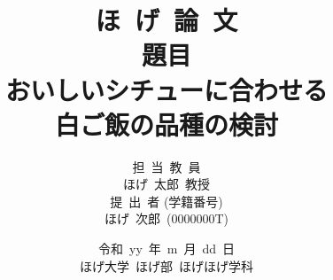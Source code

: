 \title{{\Huge ほ~げ~論~文} \\
\vspace{2cm} 題\hspace{1cm}目 \\
\vspace{0.3cm}おいしいシチューに合わせる\\白ご飯の品種の検討\\}
\author{担~当~教~員 \\ ほげ~太郎~教授 \vspace{1cm} \\
        提~出~者 (学籍番号) \\ ほげ~次郎~(0000000T)}
\date{\vspace{2cm}令和~yy~年~m~月~dd~日 \\
\vspace{2cm}ほげ大学~ほげ部~ほげほげ学科}